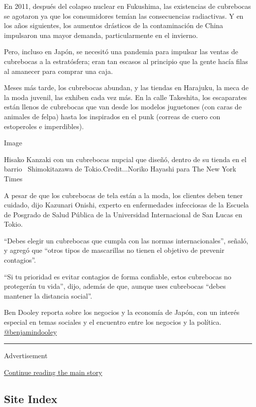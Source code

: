 En 2011, después del colapso nuclear en Fukushima, las existencias de
cubrebocas se agotaron ya que los consumidores temían las consecuencias
radiactivas. Y en los años siguientes, los aumentos drásticos de la
contaminación de China impulsaron una mayor demanda, particularmente en
el invierno.

Pero, incluso en Japón, se necesitó una pandemia para impulsar las
ventas de cubrebocas a la estratósfera; eran tan escasos al principio
que la gente hacía filas al amanecer para comprar una caja.

Meses más tarde, los cubrebocas abundan, y las tiendas en Harajuku, la
meca de la moda juvenil, las exhiben cada vez más. En la calle
Takeshita, los escaparates están llenos de cubrebocas que van desde los
modelos juguetones (con caras de animales de felpa) hasta los inspirados
en el punk (correas de cuero con estoperoles e imperdibles).

Image

Hisako Kanzaki con un cubrebocas nupcial que diseñó, dentro de su tienda
en el barrio~ Shimokitazawa de Tokio.Credit...Noriko Hayashi para The
New York Times

A pesar de que los cubrebocas de tela están a la moda, los clientes
deben tener cuidado, dijo Kazunari Onishi, experto en enfermedades
infecciosas de la Escuela de Posgrado de Salud Pública de la Universidad
Internacional de San Lucas en Tokio.

``Debes elegir un cubrebocas que cumpla con las normas
internacionales'', señaló, y agregó que ``otros tipos de mascarillas no
tienen el objetivo de prevenir contagios''.

``Si tu prioridad es evitar contagios de forma confiable, estos
cubrebocas no protegerán tu vida'', dijo, además de que, aunque uses
cubrebocas ``debes mantener la distancia social''.

Ben Dooley reporta sobre los negocios y la economía de Japón, con un
interés especial en temas sociales y el encuentro entre los negocios y
la política. \href{https://twitter.com/benjamindooley}{@benjamindooley}

\begin{center}\rule{0.5\linewidth}{\linethickness}\end{center}

Advertisement

\protect\hyperlink{after-bottom}{Continue reading the main story}

\hypertarget{site-index}{%
\subsection{Site Index}\label{site-index}}

